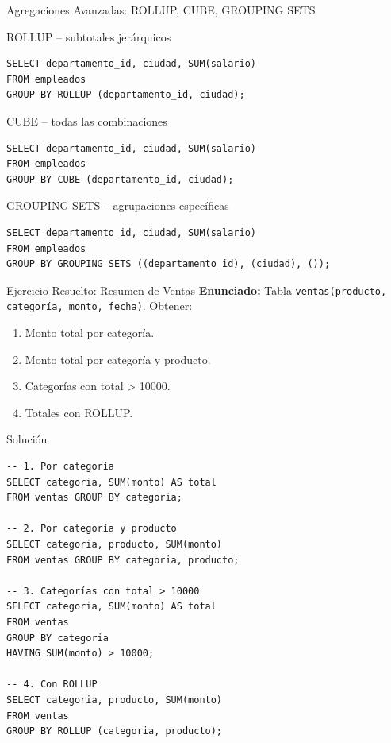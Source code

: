 \documentclass[aspectratio=169, 10pt, xcolor=table]{beamer}
\begin{document}
\begin{frame}[fragile]{Agregaciones Avanzadas: ROLLUP, CUBE, GROUPING SETS}
    \begin{block}{ROLLUP – subtotales jerárquicos}
        \begin{lstlisting}
SELECT departamento_id, ciudad, SUM(salario)
FROM empleados
GROUP BY ROLLUP (departamento_id, ciudad);
        \end{lstlisting}
    \end{block}
    \begin{block}{CUBE – todas las combinaciones}
        \begin{lstlisting}
SELECT departamento_id, ciudad, SUM(salario)
FROM empleados
GROUP BY CUBE (departamento_id, ciudad);
        \end{lstlisting}
    \end{block}
    \begin{block}{GROUPING SETS – agrupaciones específicas}
        \begin{lstlisting}
SELECT departamento_id, ciudad, SUM(salario)
FROM empleados
GROUP BY GROUPING SETS ((departamento_id), (ciudad), ());
        \end{lstlisting}
    \end{block}
\end{frame}

\begin{frame}[fragile]{Ejercicio Resuelto: Resumen de Ventas}
    \textbf{Enunciado:} Tabla \texttt{ventas(producto, categoría, monto, fecha)}. Obtener:
    \begin{enumerate}
        \item Monto total por categoría.
        \item Monto total por categoría y producto.
        \item Categorías con total > 10000.
        \item Totales con ROLLUP.
    \end{enumerate}
    \begin{block}{Solución}
        \begin{lstlisting}
-- 1. Por categoría
SELECT categoria, SUM(monto) AS total
FROM ventas GROUP BY categoria;

-- 2. Por categoría y producto
SELECT categoria, producto, SUM(monto)
FROM ventas GROUP BY categoria, producto;

-- 3. Categorías con total > 10000
SELECT categoria, SUM(monto) AS total
FROM ventas
GROUP BY categoria
HAVING SUM(monto) > 10000;

-- 4. Con ROLLUP
SELECT categoria, producto, SUM(monto)
FROM ventas
GROUP BY ROLLUP (categoria, producto);
        \end{lstlisting}
    \end{block}
\end{frame}
\end{document}
